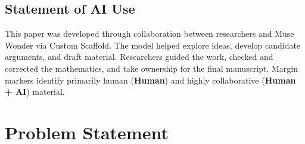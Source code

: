 \documentclass[11pt]{article}
\newcommand{\HumanLabel}{
({\bfseries\sffamily\color{humancolor!70}Human})
}
\newcommand{\HumanAILabel}{
({\bfseries\sffamily\color{humanaicolor!70}Human + AI})
}
\newcommand{\AILabel}{
({\bfseries\sffamily\color{aicolor!70}AI})
}
\theoremstyle{definition}
\numberwithin{equation}{section}
\begin{document}
\begin{humanblock}
\subsection*{Statement of AI Use}
This paper was developed through collaboration between researchers and Muse Wonder via Custom Scaffold. The model helped explore ideas, develop candidate arguments, and draft material. Researchers guided the work, checked and corrected the mathematics, and take ownership for the final manuscript. Margin markers identify primarily human \!\!\HumanLabel\!\! %
and highly collaborative\HumanAILabel\!\! material.
\end{humanblock}


\section{Problem Statement}
\end{document}
